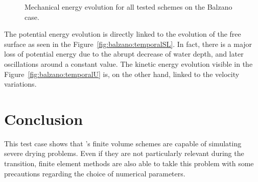 \begin{figure}[H]
  \centering
  \caption{Mechanical energy evolution for all tested schemes on the Balzano case.}
\label{fig:balzano:Em}
\end{figure}

The potential energy evolution is directly linked to the evolution of the free surface as
seen in the Figure~\ref{fig:balzano:temporalSL}. In fact, there is a major loss of
potential energy due to the abrupt decrease of water depth, and later oscillations around a constant value.
The kinetic energy evolution visible in the Figure~\ref{fig:balzano:temporalU} is,
on the other hand, linked to the velocity variations.



%
\section{Conclusion}

This test case shows that 's finite volume schemes are capable of simulating severe drying problems.
Even if they are not particularly relevant during the transition,
finite element methods are also able to takle this 
problem with some precautions regarding the choice of numerical parameters.


